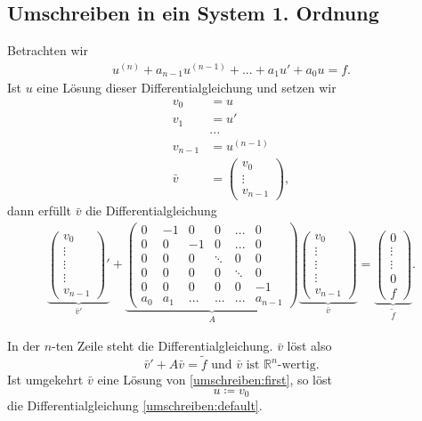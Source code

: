 \documentclass[a4paper]{book}
\theoremstyle{plain}
\theoremstyle{definition}
\newcommand{\R}{\mathbb R}
\begin{document}
\subsection{Umschreiben in ein System 1. Ordnung}
Betrachten wir 
\begin{align*}\label{umschreiben:default}
	u^{(n)} + a_{n-1}u^{(n-1)}+...+a_1u'+a_0u = f. \tag{$*$}
\end{align*} 
Ist $u$ eine Lösung dieser Differentialgleichung und setzen wir 
\begin{align*}
	v_0 &= u \\
	 v_1 &= u'\\
	 &...\\
	  v_{n-1} &= u^{(n-1)}\\
	   \bar v &= \begin{pmatrix}v_0 \\ \vdots \\ v_{n-1} \end{pmatrix},
\end{align*}
dann erfüllt $\bar v$ die Differentialgleichung 
\begin{align*}
	\underbrace{
	\begin{pmatrix}
		v_0 \\ \vdots \\ \vdots \\  \vdots   \\ v_{n-1}
	\end{pmatrix}' 
	}_{\bar v'}
	+
	\underbrace{
	\begin{pmatrix}
		0 & -1 & 0  & 0 & ... & 0 \\
		0 &  0 & -1 & 0 & ... & 0 \\
		 0  &  0   &  0   & \ddots & 0 &0 \\
		 0  &   0  &   0  &      0      & \ddots & 0 \\
		 0 & 0 & 0 & 0& 0 & -1 \\
		a_0 & a_1 & ... & ...  & ... & a_{n-1} 
	\end{pmatrix}
	}_{A}
	\underbrace{
	\begin{pmatrix}
	v_0 \\ \vdots \\ \vdots \\  \vdots   \\ v_{n-1}
	\end{pmatrix}
	}_{\bar v}
	=
	\underbrace{
	\begin{pmatrix}
	0 \\ \vdots \\ \vdots \\  0   \\ f
	\end{pmatrix}}_{\tilde f}.
\end{align*}

In der $n$-ten Zeile steht die Differentialgleichung. $\bar v$ löst also
\[ \label{umschreiben:first}
	\bar v' + A\bar v = \tilde f \text{ und $\bar v$ ist $\R^n$-wertig}. \tag{$**$}
\]
Ist umgekehrt $\bar v$ eine Lösung von \eqref{umschreiben:first}, so löst
\[
	u \coloneqq v_0
\]
die Differentialgleichung \eqref{umschreiben:default}.
	
\end{document}
